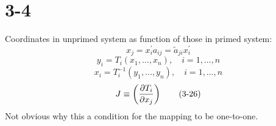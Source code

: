 \documentclass{book}
\begin{document}
\section{}
\section{3-4}

Coordinates in unprimed system as function of those in primed system:
\begin{equation}
x_j = x^\prime_ia_{ij} = \tilde a_{ji}x^\prime_i\tag{3-16}
\end{equation}
\begin{equation}
y_i = T_i(x_1,\dots,x_n), \quad i=1,\dots,n\tag{3-25}
\end{equation}
\begin{equation}
x_i = T^{-1}_i(y_1,\dots,y_n), \quad i=1,\dots,n\tag{3-25a}
\end{equation}
\begin{equation}
J \equiv \left( \partial T_i\over\partial x_j \right) \tag{3-26}
\end{equation}
Not obvious why this a condition for the mapping to be one-to-one.
\end{document}
